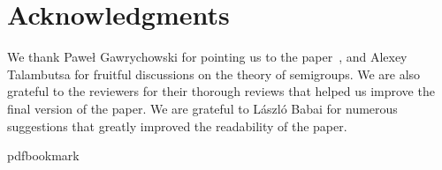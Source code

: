 \documentclass[11pt]{article}
\numberwithin{equation}{section}
\theoremstyle{definition}
\theoremstyle{plain}
\theoremstyle{plain}\newtheorem{observation}[theorem]{Observation}
\begin{document}
%
%
%
%
%
%
%
%
%
%
%
%
%
%
%
%
%
%
%
%
%
%
%
%
%
%
%
%
%
%
%
%
%
%
%
%
%
%
%
%
%
%
%
%
%
%
%
%
%
%
%
%
%
%
%
%
%
%
%
%
%
%
%
%
%
%
%
%
%
%
%
%
%
%
%
%
%
%
%
%
%
%
%
%
%
%
%
%
%
%
%
%
%
%
%
%
%


\section*{Acknowledgments}
We thank
%
%
Pawe\l{} Gawrychowski
for pointing us to the
paper~\cite{DBLP:journals/ijcga/ChazelleR91}, and Alexey Talambutsa for
fruitful discussions on the theory of semigroups.
We are also grateful to the reviewers for their thorough reviews that helped us
improve the final version of the paper.
We are grateful to László Babai for numerous suggestions that greatly improved the
readability of the paper.

\newcommand{\prelim}{Preliminary version in\ }\newcommand{\prelims}{Preliminary
  versions in\ }
\providecommand{\bibhead}[1]{}
\expandafter\ifx\csname pdfbookmark\endcsname\relax%
  \providecommand{\tocrefpdfbookmark}{}
\else\providecommand{\tocrefpdfbookmark}{%
   \hypertarget{tocreferences}{}%
   \pdfbookmark[1]{References}{tocreferences}}%
\fi
\end{document}
